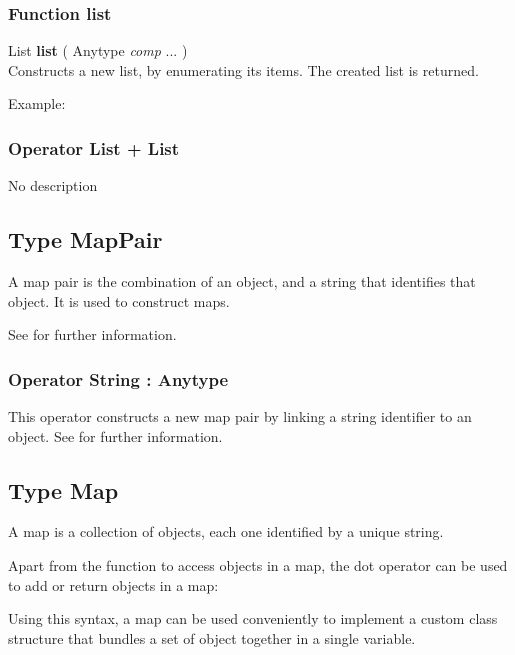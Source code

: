 \subsubsection{Function list \label{F:list}}
List \textbf{list} ( Anytype \textit{comp} ...  ) \\
Constructs a new list, by enumerating its items. The created list is returned.

Example: \\

\subsubsection{Operator List + List \label{O:List+List}}
No description

\subsection{Type MapPair \label{T:MapPair}}
A map pair is the combination of an object, and a string that identifies that object. It is used to construct maps.

See  for further information.

\subsubsection{Operator String : Anytype \label{O:String:Anytype}}
This operator constructs a new map pair by linking a string identifier to an object. See  for further information.

\subsection{Type Map \label{T:Map}}
A map is a collection of objects, each one identified by a unique string. 

Apart from the function  to access objects in a map, the dot operator can be used to add or return objects in a map: \\

Using this syntax, a map can be used conveniently to implement a custom class structure that bundles a set of object together in a single variable.



